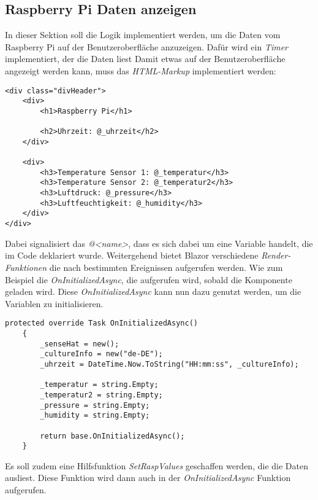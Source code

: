 \subsection{Raspberry Pi Daten anzeigen}
\label{subsec:DatenAnzeigen}
In dieser Sektion soll die Logik implementiert werden, um die Daten vom Raspberry Pi auf der
Benutzeroberfläche anzuzeigen. Dafür wird ein
\emph{Timer} implementiert, der die Daten liest
\newline
\newline
Damit etwas auf der Benutzeroberfläche angezeigt werden kann, muss das \emph{HTML-Markup}
implementiert werden:

\begin{lstlisting}[language={[Sharp]C}, caption=HTML-Markup,
    label=lst:HtmlMarkup]
<div class="divHeader">
    <div>
        <h1>Raspberry Pi</h1>

        <h2>Uhrzeit: @_uhrzeit</h2>
    </div>

    <div>
        <h3>Temperature Sensor 1: @_temperatur</h3>
        <h3>Temperature Sensor 2: @_temperatur2</h3>
        <h3>Luftdruck: @_pressure</h3>
        <h3>Luftfeuchtigkeit: @_humidity</h3>
    </div>
</div>
\end{lstlisting}

Dabei signalisiert das \emph{@<name>}, dass es sich dabei um eine Variable handelt, die im Code
deklariert wurde.
\newline
\newline
Weitergehend bietet Blazor verschiedene \emph{Render-Funktionen} die nach bestimmten Ereignissen
aufgerufen werden. Wie zum Beispiel die \emph{OnInitializedAsync}, die aufgerufen wird, sobald die
Komponente geladen wird. Diese \emph{OnInitializedAsync} kann nun dazu genutzt werden, um die
Variablen zu initialisieren.

\begin{lstlisting}[language={[Sharp]C}, caption=Render-Funktion: OnInitializedAsync,
    label=lst:OnInitializedAsync]
    protected override Task OnInitializedAsync()
    {
        _senseHat = new();
        _cultureInfo = new("de-DE");
        _uhrzeit = DateTime.Now.ToString("HH:mm:ss", _cultureInfo);

        _temperatur = string.Empty;
        _temperatur2 = string.Empty;
        _pressure = string.Empty;
        _humidity = string.Empty;

        return base.OnInitializedAsync();
    }
\end{lstlisting}

Es soll zudem eine Hilfsfunktion \emph{SetRaspValues} geschaffen werden, die die Daten
ausliest. Diese Funktion wird dann auch in der \emph{OnInitializedAsync} Funktion aufgerufen.

